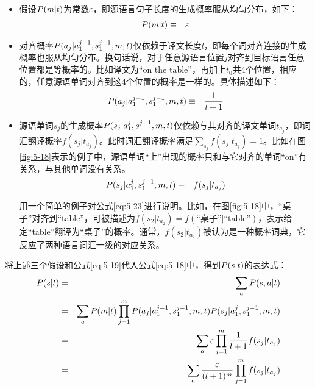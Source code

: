 \begin{itemize}
\item 假设${P}(m|{t})$为常数$\varepsilon$，即源语言句子长度的生成概率服从均匀分布，如下：
\begin{eqnarray}
{P}(m|{t})& \equiv & \varepsilon
\label{eq:5-21}
\end{eqnarray}
\item 对齐概率${P}(a_j|a_1^{j-1},s_1^{j-1},m,{t})$仅依赖于译文长度$l$，即每个词对齐连接的生成概率也服从均匀分布。换句话说，对于任意源语言位置$j$对齐到目标语言任意位置都是等概率的。比如译文为“on the table”，再加上$t_0$共4个位置，相应的，任意源语单词对齐到这4个位置的概率是一样的。具体描述如下：
\begin{eqnarray}
{P}(a_j|a_1^{j-1},s_1^{j-1},m,{t})& \equiv &  \frac{1}{l+1}
\label{eq:5-22}
\end{eqnarray}

\item 源语单词$s_j$的生成概率${P}(s_j|a_1^{j},s_1^{j-1},m,{t})$仅依赖与其对齐的译文单词$t_{a_j}$，即词汇翻译概率$f(s_j|t_{a_j})$。此时词汇翻译概率满足$\sum_{s_j}{f(s_j|t_{a_j})}=1$。比如在图\ref{fig:5-18}表示的例子中，源语单词“上”出现的概率只和与它对齐的单词“on”有关系，与其他单词没有关系。
\begin{eqnarray}
{P}(s_j|a_1^{j},s_1^{j-1},m,{t})& \equiv &  f(s_j|t_{a_j})
\label{eq:5-23}
\end{eqnarray}

用一个简单的例子对公式\eqref{eq:5-23}进行说明。比如，在图\ref{fig:5-18}中，“桌子”对齐到“table”，可被描述为$f(s_2 |t_{a_2})=f(\textrm{“桌子”}|\textrm{“table”})$，表示给定“table”翻译为“桌子”的概率。通常，$f(s_2 |t_{a_2})$被认为是一种概率词典，它反应了两种语言词汇一级的对应关系。
\end{itemize}

\parinterval 将上述三个假设和公式\eqref{eq:5-19}代入公式\eqref{eq:5-18}中，得到${P}({s}|{t})$的表达式：
\begin{eqnarray}
{P}({s}|{t}) & = &  \sum_{{a}}{{P}({s},{a}|{t})} \nonumber \\
                        & = &  \sum_{{a}}{{P}(m|{t})}\prod_{j=1}^{m}{{P}(a_j|a_1^{j-1},s_1^{j-1},m,{t}){P}(s_j |a_1^j,s_1^{j-1},m,{t})} \nonumber \\
                        & = &  \sum_{{a}}{\varepsilon}\prod_{j=1}^{m}{\frac{1}{l+1}f(s_j|t_{a_j})} \nonumber \\
                        & = & \sum_{{a}}{\frac{\varepsilon}{(l+1)^m}}\prod_{j=1}^{m}f(s_j|t_{a_j})
\label{eq:5-24}
\end{eqnarray}

